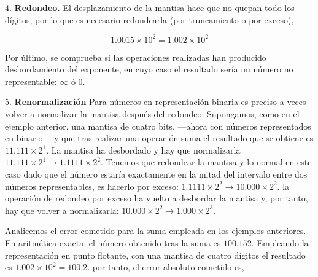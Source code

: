 \begin{paracol}{2}
4. \textbf{Redondeo.} El desplazamiento de la mantisa hace que no quepan todo los dígitos, por lo que es necesario redondearla (por truncamiento o por exceso),
\end{paracol}
\begin{equation*}
1.0015\times10^2=1.002\times10^2
\end{equation*}
\begin{paracol}{2}
Por último, se comprueba si las operaciones realizadas han producido desbordamiento del exponente, en cuyo caso el resultado sería un número no representable: $\infty$ ó $0$.

5. \textbf{Renormalización} Para números en representación binaria es preciso a veces volver a normalizar la mantisa después del redondeo. Supongamos, como en el ejemplo anterior, una mantisa de cuatro bits, ---ahora con números representados en binario--- y que tras realizar una operación suma el resultado que se obtiene es $11.111\times2^1$. La mantisa ha desbordado y hay que normalizarla $11.111\times2^1\rightarrow1.1111\times2^2$. Tenemos que redondear la mantisa y lo normal en este caso dado que el número estaría exactamente en la mitad del intervalo entre dos números representables, es hacerlo por exceso: $1.1111\times2^2\rightarrow10.000\times2^2$. la operación de redondeo por exceso ha vuelto a desbordar la mantisa y, por tanto, hay que volver a normalizarla: $10.000\times2^2\rightarrow1.000\times2^3$.

Analicemos el error cometido para la suma empleada en los ejemplos anteriores. En aritmética exacta, el número obtenido tras la suma es $100.152$. Empleando la representación en punto flotante, con una mantisa de cuatro dígitos el resultado es $1.002\times10^2=100.2$. por tanto, el error absoluto cometido es,
\end{paracol}

